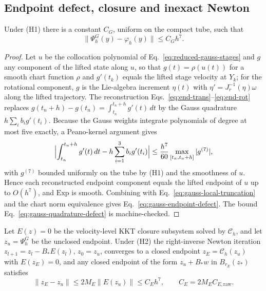 \subsection{Endpoint defect, closure and inexact Newton}

\begin{lemma}
\label{lem:gauss-endpoint-defect}
Under (H1) there is a constant $C_G$, uniform on the compact tube, such that
\begin{equation}
  \|\Psi_h^G(y)-\varphi_h(y)\|\le C_Gh^7 .
  \label{eq:gauss-endpoint-defect}
\end{equation}
\end{lemma}

\begin{proof}
Let $u$ be the collocation polynomial of Eq.~\eqref{eq:reduced-gauss-stages} and $g$ any
component of the lifted state along $u$, so that $g(t)=\rho(u(t))$ for a smooth chart function
$\rho$ and $g'(t_k)$ equals the lifted stage velocity at $Y_k$; for the rotational component, $g$
is the Lie-algebra increment $\eta(t)$ with $\eta'=J_r^{-1}(\eta)\omega$ along the lifted
trajectory. The reconstruction Eqs.~\eqref{eq:end-trans}--\eqref{eq:end-rot} replaces
$g(t_n+h)-g(t_n)=\int_{t_n}^{t_n+h}g'(t)\,dt$ by the Gauss quadrature $h\sum_ib_ig'(t_i)$. Because
the Gauss weights integrate polynomials of degree at most five exactly, a Peano-kernel argument
gives
\begin{equation}
  \Bigl|\int_{t_n}^{t_n+h}g'(t)\,dt-h\sum_{i=1}^3b_ig'(t_i)\Bigr|
  \le\frac{h^7}{60}\max_{[t_n,t_n+h]}|g^{(7)}| ,
  \label{eq:gauss-quadrature-defect}
\end{equation}
with $g^{(7)}$ bounded uniformly on the tube by (H1) and the smoothness of $u$. Hence each
reconstructed endpoint component equals the lifted endpoint of $u$ up to $O(h^7)$, and $\mathrm{Exp}$
is smooth. Combining with Eq.~\eqref{eq:gauss-local-truncation} and the chart norm equivalence gives
Eq.~\eqref{eq:gauss-endpoint-defect}. The bound Eq.~\eqref{eq:gauss-quadrature-defect} is
machine-checked.
\end{proof}

\begin{lemma}
\label{lem:endpoint-closure}
Let $E(z)=0$ be the velocity-level KKT closure subsystem solved by $\mathcal C_h$, and let
$z_u=\Psi_h^G$ be the unclosed endpoint. Under (H2) the right-inverse Newton iteration
$z_{l+1}=z_l-B_\ast E(z_l)$, $z_0=z_u$, converges to a closed endpoint $z_E=\mathcal C_h(z_u)$
with $E(z_E)=0$, and any closed endpoint of the form $z_u+B_\ast w$ in $B_{r_E}(z_\ast)$ satisfies
\begin{equation}
  \|z_E-z_u\|\le 2M_{E}\|E(z_u)\|\le C_Eh^7,\qquad C_E=2M_{E}C_{E,\mathrm{raw}} .
  \label{eq:endpoint-correction-bound}
\end{equation}
\end{lemma}

